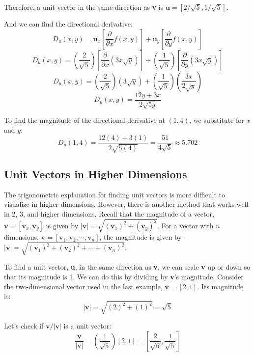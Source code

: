 Therefore, a unit vector in the same direction as \textbf{v} is $\textbf{u} = 
\left[ 2/\sqrt{5}, 1/\sqrt{5} \right]$. 

And we can find the directional derivative:
$$D_u(x, y) = \textbf{u}_x \left[ \frac{\partial}{\partial x} f(x, y) \right] 
+ \textbf{u}_y \left[ \frac{\partial}{\partial y} f(x, y) \right]$$
$$D_u(x, y) = \left( \frac{2}{\sqrt{5}} \right) \left[ \frac{\partial}{
\partial x} \left( 3x\sqrt{y} \right) \right] + \left( \frac{1}{\sqrt{5}} 
\right) \left[ \frac{\partial}{\partial y} \left( 3x\sqrt{y} \right) \right]$$
$$D_u(x, y) = \left( \frac{2}{\sqrt{5}} \right) \left( 3\sqrt{y} \right) + 
\left( \frac{1}{\sqrt{5}} \right) \left( \frac{3x}{2\sqrt{y}} \right)$$
$$D_u(x, y) = \frac{12y + 3x}{2\sqrt{5y}}$$

To find the magnitude of the directional derivative at $(1, 4)$, we 
substitute for $x$ and $y$:
$$D_u(1, 4) = \frac{12(4) + 3(1)}{2\sqrt{5(4)}} = \frac{51}{4\sqrt{5}} 
\approx 5.702$$

\subsection{Unit Vectors in Higher Dimensions}
The trigonometric explanation for finding unit vectors is more difficult to visualize in higher dimensions. However, there is another method that works well in 2, 3, and higher dimensions. Recall that the magnitude of a vector, $\textbf{v} = \left[ \textbf{v}_x, \textbf{v}_y \right]$ is given by $| \textbf{v} | = \sqrt{\left( \textbf{v}_x \right)^2 + \left( \textbf{v}_y \right)^2}$. For a vector with $n$ dimensions, $\textbf{v} = \left[ \textbf{v}_1, \textbf{v}_2, \cdots , \textbf{v}_n \right]$, the magnitude is given by $| \textbf{v} | = \sqrt{ \left( \textbf{v}_1 \right)^2 + \left( \textbf{v}_2 \right)^2 + \cdots + \left( \textbf{v}_n \right)^2}$. 

To find a unit vector, \textbf{u}, in the same direction as \textbf{v}, we can scale \textbf{v} up or down so that its magnitude is 1. We can do this by dividing by \textbf{v}'s magnitude. Consider the two-dimensional vector used in the last example, $\textbf{v} = \left[ 2, 1 \right]$. Its magnitude is:
$$| \textbf{v} | = \sqrt{\left( 2 \right)^2 + \left( 1 \right)^2} = \sqrt{5}$$

Let's check if $\textbf{v} / | \textbf{v} |$ is a unit vector:
$$ \frac{\textbf{v}}{|\textbf{v}|} = \left( \frac{1}{\sqrt{5}} \right) \left[ 2, 1 \right] = \left[ \frac{2}{\sqrt{5}}, \frac{1}{\sqrt{5}} \right]$$

